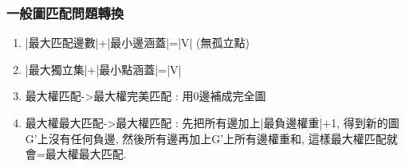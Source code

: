\subsubsection{一般圖匹配問題轉換}
\begin{enumerate}\itemsep=-5pt
\item |最大匹配邊數|+|最小邊涵蓋|=|V| (無孤立點)
\item |最大獨立集|+|最小點涵蓋|=|V|
\item 最大權匹配->最大權完美匹配 : 用0邊補成完全圖
\item 最大權最大匹配->最大權匹配 : 先把所有邊加上|最負邊權重|+1, 得到新的圖G’上沒有任何負邊, 然後所有邊再加上G'上所有邊權重和, 這樣最大權匹配就會=最大權最大匹配.
\end{enumerate}
